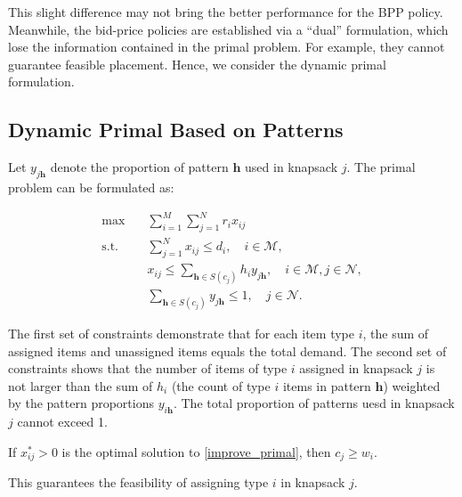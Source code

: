 This slight difference may not bring the better performance for the BPP policy. Meanwhile, the bid-price policies are established via a ``dual'' formulation, which lose the information contained in the primal problem. For example, they cannot guarantee feasible placement. Hence, we consider the dynamic primal formulation.

\subsection{Dynamic Primal Based on Patterns}

Let $y_{j \bm{h}}$ denote the proportion of pattern $\bm{h}$ used in knapsack $j$. The primal problem can be formulated as:

\begin{equation}\label{improve_primal}
    \begin{aligned}
    \max \quad & \sum_{i=1}^M \sum_{j=1}^N r_i x_{i j} \\
    \text {s.t.} \quad & \sum_{j=1}^N x_{i j} \leq d_i, \quad i \in \mathcal{M}, \\
    & x_{i j} \leq \sum_{\bm{h} \in S(c_{j})} h_i y_{j \bm{h}}, \quad i \in \mathcal{M}, j \in \mathcal{N}, \\
    & \sum_{\bm{h} \in S(c_{j})} y_{j \bm{h}} \leq 1, \quad j \in \mathcal{N}.
    \end{aligned}
\end{equation}

The first set of constraints demonstrate that for each item type $i$, the sum of assigned items and unassigned items equals the total demand. The second set of constraints shows that the number of items of type $i$ assigned in knapsack $j$ is not larger than the sum of $h_{i}$ (the count of type $i$ items in pattern $\bm{h}$) weighted by the pattern proportions $y_{i \bm{h}}$. The total proportion of patterns uesd in knapsack $j$ cannot exceed 1.

\begin{lem}
If $x_{ij}^{*} > 0$ is the optimal solution to \eqref{improve_primal}, then $c_{j} \geq w_{i}$.
\end{lem}

This guarantees the feasibility of assigning type $i$ in knapsack $j$.



